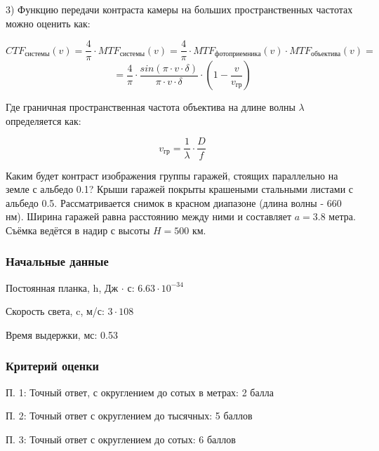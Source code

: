 3) Функцию передачи контраста камеры на больших пространственных частотах можно оценить как:

$$CTF_{\text{системы}}(v) = \frac{4}{\pi} \cdot MTF_{\text{системы}}(v) =
\frac{4}{\pi} \cdot MTF_{\text{фотоприемника}}(v) \cdot MTF_{\text{объектива}}(v) = $$
$$ = \frac{4}{\pi} \cdot \frac{sin(\pi \cdot v \cdot \delta)}{\pi \cdot v \cdot \delta} \cdot \left(1 - \frac{v}{v_{\text{гр}}} \right)$$
 
Где граничная пространственная частота объектива на длине волны $\lambda$ определяется как:
 
$$v_{\text{гр}} = \frac{1}{\lambda} \cdot \frac{D}{f}$$

Каким будет контраст изображения группы гаражей, стоящих параллельно на земле с 
альбедо 0.1? Крыши гаражей покрыты крашеными стальными листами с альбедо 0.5. 
Рассматривается снимок в красном диапазоне (длина волны - 660 нм). Ширина 
гаражей равна расстоянию между ними и составляет $a = 3.8$ метра. Съёмка ведётся в 
надир с высоты $H = 500$ км.

\subsubsection*{Начальные данные}

Постоянная планка, h, Дж $\cdot$ с: $6.63 \cdot 10^{-34}$

Скорость света, c, м/с: $3 \cdot 108$

Время выдержки, мс: 0.53

\subsubsection*{Критерий оценки}

П. 1: Точный ответ, с округлением до сотых в метрах: 2 балла

П. 2: Точный ответ с округлением до тысячных: 5 баллов

П. 3: Точный ответ с округлением до сотых: 6 баллов